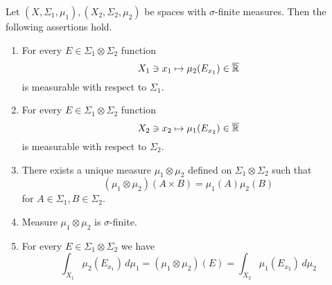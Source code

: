 \begin{theorem}\label{theorem:fubinis_theorem_basic}
Let $(X,\Sigma_1,\mu_1), (X_2,\Sigma_2,\mu_2)$ be spaces with $\sigma$-finite measures. Then the following assertions hold.
\begin{enumerate}[label=\emph{\textbf{(\arabic*)}}, leftmargin=*]
\item For every $E\in \Sigma_1\otimes \Sigma_2$ function
$$X_1\ni x_1\mapsto \mu_2(E_{x_1})\in \overline{{\mathbb R}}$$
is measurable with respect to $\Sigma_1$.
\item For every $E\in \Sigma_1\otimes \Sigma_2$ function
$$X_2\ni x_2\mapsto \mu_1(E_{x_2})\in \overline{{\mathbb R}}$$
is measurable with respect to $\Sigma_2$.
\item There exists a unique measure $\mu_1\otimes \mu_2$ defined on $\Sigma_1\otimes \Sigma_2$ such that
$$\left(\mu_1\otimes \mu_2\right)\left(A\times B\right) = \mu_1(A)\mu_2(B)$$
for $A\in \Sigma_1, B\in \Sigma_2$.
\item Measure $\mu_1\otimes \mu_2$ is $\sigma$-finite.
\item For every $E\in \Sigma_1\otimes \Sigma_2$ we have
$$\int_{X_1}\mu_2(E_{x_1})\,d\mu_1 = \left(\mu_1\otimes \mu_2\right)(E) = \int_{X_2}\mu_1(E_{x_2})\,d\mu_2$$
\end{enumerate}
\end{theorem}
